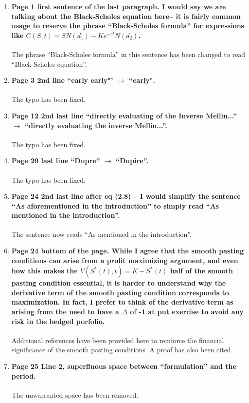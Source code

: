 \documentclass{article}
\begin{document}
\begin{enumerate}
    \item \textbf{Page 1 first sentence of the last paragraph. I would say we are talking about the Black-Scholes equation here-- it is fairly common usage to reserve the phrase ``Black-Scholes formula'' for expressions like $C(S,t) = SN(d_1) - Ke^{-rt}N(d_2)$.
    \\
    \\}
    The phrase ``Black-Scholes formula'' in this sentence has been changed to read ``Black-Scholes equation''.
     \item \textbf{Page 3 2nd line ``early early"' $\rightarrow$ ``early".
    \\
    \\}
    The typo has been fixed.
     \item \textbf{Page 12 2nd last line ``directly evaluating of the Inverse Mellin...'' $\rightarrow$ ``directly evaluating the inverse Mellin...''.
    \\
    \\}
    The typo has been fixed.
     \item \textbf{Page 20 last line ``Dupre'' $\rightarrow$ ``Dupire''.
    \\
    \\}
    The typo has been fixed.
     \item \textbf{Page 24 2nd last line after eq (2.8) -- I would simplify the sentence ``As aforementioned in the introduction'' to simply read ``As mentioned in the introduction''.
    \\
    \\}
    The sentence now reads ``As mentioned in the introduction''.
      \item \textbf{Page 24 bottom of the page. While I agree that the smooth pasting conditions can arise from a profit maximizing argument, and even how this makes the $V(S^*(t),t) = K - S^*(t)$ half of the smooth pasting condition essential, it is harder to understand why the derivative term of the smooth pasting condition corresponds to maximization. In fact, I prefer to think of the derivative term as arising from the need to have a $\Delta$ of -1 at put exercise to avoid any risk in the hedged porfolio. 
    \\
    \\}
    Additional references have been provided here to reinforce the financial significance of the smooth pasting conditions. A proof has also been cited.
    
      \item \textbf{Page 25 Line 2, superfluous space between ``formulation'' and the period.
    \\
    \\}
    The unwarranted space has been removed.
    

\end{enumerate}
\end{document}
